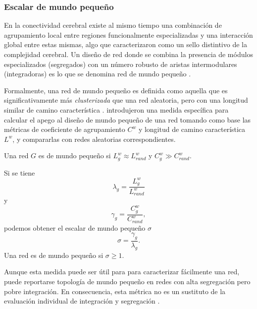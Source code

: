 \subsubsection{Escalar de mundo pequeño}
En la conectividad cerebral existe al mismo tiempo una combinación de agrupamiento local entre regiones funcionalmente especializadas y una interacción global entre estas mismas, algo que \textcite{Tononi1994} caracterizaron como un sello distintivo de la complejidad cerebral.
Un diseño de red donde se combina la presencia de módulos especializados (segregados) con un número robusto de aristas intermodulares (integradoras) es lo que se denomina red de mundo pequeño \parencite{Rubinov2010}. \par
Formalmente, una red de mundo pequeño es definida como aquella que es significativamente más \textit{clusterizada} que una red aleatoria, pero con una longitud similar de camino característica \parencite{Watts1998}.
\textcite{Humphries2008} introdujeron una medida específica para calcular el apego al diseño de mundo pequeño de una red tomando como base las métricas de coeficiente de agrupamiento $C^w$ y longitud de camino característica $L^w$, y compararlas con redes aleatorias correspondientes.\par
Una red $G$ es de mundo pequeño si $L_g^w \approx L_{rand}^w$ y $C_g^w \gg C_{rand}^w$. \par
Si se tiene
\begin{equation}\label{eqLambda}
    \lambda_g=\frac{L_g^w}{L_{rand}^w}
\end{equation}
y
\begin{equation}\label{eqGamma}
    \gamma_g=\frac{C_g^w}{C_{rand}^w},
\end{equation}
podemos obtener el escalar de mundo pequeño $\sigma$
\begin{equation}\label{eqSW}
    \sigma=\frac{\gamma_g}{\lambda_g}.
\end{equation}
Una red es de mundo pequeño si $\sigma \geq 1$.\par
Aunque esta medida puede ser útil para para caracterizar fácilmente una red, puede reportarse topología de mundo pequeño en redes con alta segregación pero pobre integración.
En consecuencia, esta métrica no es un sustituto de la evaluación individual de integración y segregación \parencite{Rubinov2010}.


